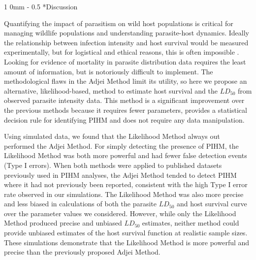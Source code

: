 \documentclass[12pt, a4paper]{article}
\makeatletter
\renewcommand{\section}{\@startsection
{section}%
{1}%
{0mm}%
{-\baselineskip}%
{0.5\baselineskip}%
{\normalfont\bf\large}} %
\makeatother
\begin{document}
\section*{Discussion}


Quantifying the impact of parasitism on wild host populations is critical for managing wildlife populations and understanding parasite-host dynamics. Ideally the relationship between
infection intensity and host survival would be measured experimentally, but for
logistical and ethical reasons, this is often impossible \citep{McCallum2000a}.
Looking for evidence of mortality in parasite distribution data requires the
least amount of information, but is notoriously difficult to implement. The
methodological flaws in the Adjei Method limit its utility, so here we propose
an alternative, likelihood-based, method to estimate host survival and the
$LD_{50}$ from observed parasite intensity data.  This
method is a significant improvement over the previous methods because it requires fewer parameters,
provides a statistical decision rule for identifying PIHM and does not require
any data manipulation.

Using simulated data, we found that the Likelihood Method always out performed the Adjei Method. For simply detecting the presence of PIHM, the Likelihood
Method was both more powerful and had fewer false detection events (Type I
errors).  When both methods were applied to published datasets previously used
in PIHM analyses, the Adjei Method tended to detect PIHM where it had not previously been
reported, consistent with the high Type I error rate observed in our
simulations. The Likelihood Method was also more precise and less
biased in calculations of both the parasite $LD_{50}$ and host survival curve over the parameter values we considered.
However, while only the Likelihood Method produced precise and unbiased $LD_{50}$
estimates, neither method could provide unbiased estimates of the host survival
function at realistic sample sizes.  These simulations demonstrate that
the Likelihood Method is more powerful and precise than the previously proposed Adjei Method.
\end{document}
